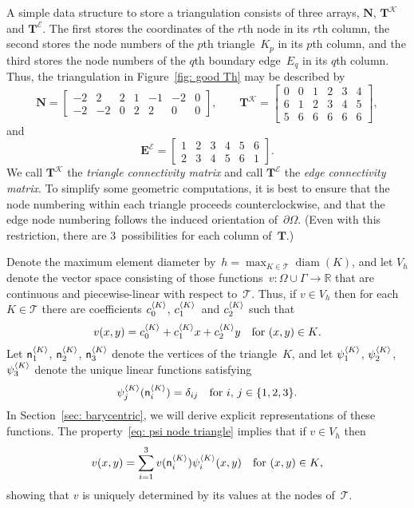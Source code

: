 A simple data structure to store a triangulation consists of three arrays,
$\boldsymbol{N}$, $\boldsymbol{T}^{\mathcal{K}}$ and
$\boldsymbol{T}^{\mathcal{E}}$.  The first stores the coordinates of the
$r$th node in its $r$th column, the second stores the node numbers of the
$p$th triangle~$K_p$ in its $p$th column, and the third stores the node numbers
of the $q$th boundary edge~$E_q$ in its $q$th column.  Thus, the triangulation
in Figure~\ref{fig: good Th} may be described by
\[
\boldsymbol{N}=\begin{bmatrix}
-2& 2& 2& 1&-1&-2& 0\\                
-2&-2& 0& 2& 2& 0& 0
\end{bmatrix},\qquad
\boldsymbol{T}^{\mathcal{K}}=\begin{bmatrix}
0&0&1&2&3&4\\
6&1&2&3&4&5\\
5&6&6&6&6&6\end{bmatrix},
\]
and
\[
\boldsymbol{E}^{\mathcal{E}}=\begin{bmatrix}
1&2&3&4&5&6\\
2&3&4&5&6&1\end{bmatrix}.
\]
We call $\boldsymbol{T}^{\mathcal{K}}$ the \emph{triangle connectivity matrix}
and call $\boldsymbol{T}^{\mathcal{E}}$ the \emph{edge connectivity matrix}.
To simplify some geometric computations, it is best to ensure that the node
numbering within each triangle proceeds counterclockwise, and that the edge
node numbering follows the induced orientation of~$\partial\Omega$. (Even with 
this restriction, there are $3$~possibilities for each column 
of~$\boldsymbol{T}$.)

Denote the maximum element diameter 
by~$h=\max_{K\in\mathcal{T}}\operatorname{diam}(K)$, and let $V_h$ denote the 
vector space consisting of those functions~$v:\Omega\cup\Gamma\to\mathbb{R}$ 
that are continuous and piecewise-linear with respect to~$\mathcal{T}$.  Thus,
if $v\in V_h$ then for each~$K\in\mathcal{T}$ there are coefficients 
$c^{\langle K\rangle}_0$, $c^{\langle K\rangle}_1$~and $c^{\langle K\rangle}_2$ such that
\begin{equation}\label{eq: v K 1 x y}
v(x,y)=c^{\langle K\rangle}_0+c^{\langle K\rangle}_1x+c^{\langle K\rangle}_2y
	\quad\text{for $(x,y)\in K$.}
\end{equation}
Let $\mathsf{n}^{\langle K\rangle}_1$, $\mathsf{n}^{\langle K\rangle}_2$, $\mathsf{n}^{\langle K\rangle}_3$ 
denote the vertices of the triangle~$K$, and let $\psi^{\langle K\rangle}_1$, 
$\psi^{\langle K\rangle}_2$, $\psi^{\langle K\rangle}_3$ denote the unique linear functions 
satisfying
\begin{equation}\label{eq: psi node triangle}
\psi^{\langle K\rangle}_j(\mathsf{n}^{\langle K\rangle}_i)=\delta_{ij}
	\quad\text{for $i$, $j\in\{1,2,3\}$.}
\end{equation}
In Section~\ref{sec: barycentric}, we will derive explicit representations of 
these functions.  The property~\eqref{eq: psi node triangle} implies that if 
$v\in V_h$ then
\[
v(x,y)=\sum_{i=1}^3v(\mathsf{n}^{\langle K\rangle}_i)\psi^{\langle K\rangle}_i(x,y)
	\quad\text{for $(x,y)\in K$,}
\]
showing that $v$ is uniquely determined by its values at the nodes 
of~$\mathcal{T}$.


